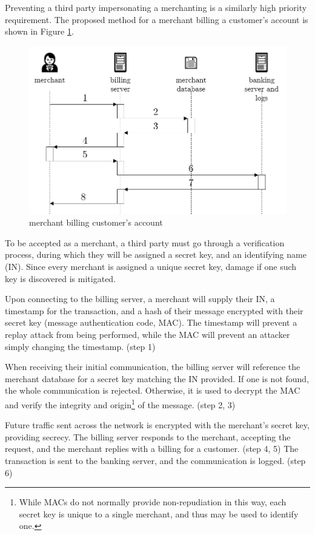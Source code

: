 Preventing a third party impersonating a merchanting is a similarly high priority requirement.  The proposed method for a merchant billing a customer's account is shown in Figure \ref{merchantBilling}.

\begin{figure}
    \includegraphics[width=\columnwidth]{images/merchant-billing}
    \caption{merchant billing customer's account}
    \centering
    \label{merchantBilling}
\end{figure}

To be accepted as a merchant, a third party must go through a verification process, during which they will be assigned a secret key, and an identifying name (IN). Since every merchant is assigned a unique secret key, damage if one such key is discovered is mitigated.

Upon connecting to the billing server, a merchant will supply their IN, a timestamp for the transaction, and a hash of their message encrypted with their secret key (message authentication code, MAC). The timestamp will prevent a replay attack from being performed, while the MAC will prevent an attacker simply changing the timestamp. (step 1)

When receiving their initial communication, the billing server will reference the merchant database for a secret key matching the IN provided. If one is not found, the whole communication is rejected. Otherwise, it is used to decrypt the MAC and verify the integrity and origin\footnote{
    While MACs do not normally provide non-repudiation in this way, each secret key is unique to a single merchant, and thus may be used to identify one. 
} of the message. (step 2, 3)

Future traffic sent across the network is encrypted with the merchant's secret key, providing secrecy. The billing server responds to the merchant, accepting the request, and the merchant replies with a billing for a customer. (step 4, 5) The transaction is sent to the banking server, and the communication is logged. (step 6)

